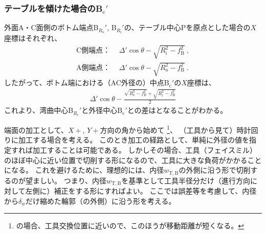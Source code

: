 \subsubsection{テーブルを傾けた場合のB\texorpdfstring{$_\mathrm c'$}{c'}}
外面A・C面側のボトム端点B$_{R_\mathrm o}'$, B$_{R_\mathrm i}'$の、テーブル中心Pを原点とした場合の$X$座標はそれぞれ、
\begin{subequations}
  \label{eq:tableBRio}
\begin{align}
  \label{eq:tableBRi}
  \text{C側端点：}&~~
  \varDelta'\cos\theta-\sqrt{R_\mathrm i^2-f_\mathrm B^2}\ ,\\
  \text{A側端点：}&~~
  \varDelta'\cos\theta-\sqrt{R_\mathrm o^2-f_\mathrm B^2}\ .
\end{align}
\end{subequations}
したがって、ボトム端における（AC外径の）中点B$_\mathrm c'$の$X$座標は、
\begin{align}
  \label{eq:tableBc}
  \varDelta'\cos\theta-\frac{\sqrt{R_\mathrm o^2-f_\mathrm B^2}+\sqrt{R_\mathrm i^2-f_\mathrm B^2}}2
\end{align}
これより、湾曲中心B$_{R_\mathrm c}'$と外径中心B$_\mathrm c'$との差はとなることがわかる。




\clearpage
端面の加工として、$X+$, $Y+$方向の角から始めて
\footnote{\DMname の場合、工具交換位置に近いので、このほうが移動距離が短くなる。}、
（工具から見て）時計回りに加工する場合を考える。
このとき加工の経路として、単純に外径の値を指定すれば加工することは可能である。
しかしその場合、工具（フェイスミル）のほぼ中心に近い位置で切削する形になるので、工具に大きな負荷がかかることになる。
これを避けるために、理想的には、内径$w_{\mathrm T, \mathrm B}$の外側に沿う形で切削するのが望ましい。
つまり、内径$w_{\mathrm T, \mathrm B}$を基準として工具半径分だけ（進行方向に対して左側に）補正をする形にすればよい。
ここでは誤差等を考慮して、内径から$\delta_w$だけ縮めた輪郭（の外側）に沿う形を考える。



